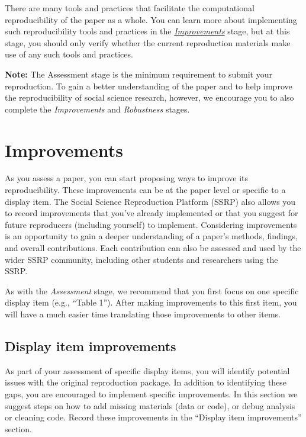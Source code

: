 \documentclass[
  openany]{book}
\begin{document}
There are many tools and practices that facilitate the computational reproducibility of the paper as a whole. You can learn more about implementing such reproducibility tools and practices in the \href{https://bitss.github.io/ACRE/improvements.html}{\emph{Improvements}} stage, but at this stage, you should only verify whether the current reproduction materials make use of any such tools and practices.

\textbf{Note:} The Assessment stage is the minimum requirement to submit your reproduction. To gain a better understanding of the paper and to help improve the reproducibility of social science research, however, we encourage you to also complete the \emph{Improvements} and \emph{Robustness} stages.

\hypertarget{improvements}{%
\chapter{Improvements}\label{improvements}}

As you assess a paper, you can start proposing ways to improve its reproducibility. These improvements can be at the paper level or specific to a display item. The Social Science Reproduction Platform (SSRP) also allows you to record improvements that you've already implemented or that you suggest for future reproducers (including yourself) to implement. Considering improvements is an opportunity to gain a deeper understanding of a paper's methods, findings, and overall contributions. Each contribution can also be assessed and used by the wider SSRP community, including other students and researchers using the SSRP.

As with the \emph{Assessment} stage, we recommend that you first focus on one specific display item (e.g., ``Table 1''). After making improvements to this first item, you will have a much easier time translating those improvements to other items.

\hypertarget{di-imp}{%
\section{Display item improvements}\label{di-imp}}

As part of your assessment of specific display items, you will identify potential issues with the original reproduction package. In addition to identifying these gaps, you are encouraged to implement specific improvements. In this section we suggest steps on how to add missing materials (data or code), or debug analysis or cleaning code. Record these improvements in the ``Display item improvements'' section.
\end{document}
